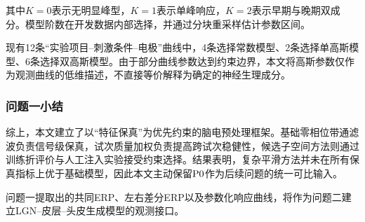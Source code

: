 其中$K=0$表示无明显峰型，$K=1$表示单峰响应，$K=2$表示早期与晚期双成分。模型阶数在开发数据内部选择，并通过分块重采样估计参数区间。

现有12条“实验项目--刺激条件--电极”曲线中，4条选择常数模型、2条选择单高斯模型、6条选择双高斯模型。由于部分曲线参数达到约束边界，本文将高斯参数仅作为观测曲线的低维描述，不直接等价解释为确定的神经生理成分。


\subsubsection{问题一小结}

综上，本文建立了以“特征保真”为优先约束的脑电预处理框架。基础零相位带通滤波负责信号级保真，试次质量加权负责提高跨试次稳健性，候选子空间方法则通过训练折评价与人工注入实验接受约束选择。结果表明，复杂平滑方法并未在所有保真指标上优于基础模型，因此本文主动保留$\mathrm{P0}$作为后续问题的统一可比输入。

问题一提取出的共同ERP、左右差分ERP以及参数化响应曲线，将作为问题二建立LGN--皮层--头皮生成模型的观测接口。
